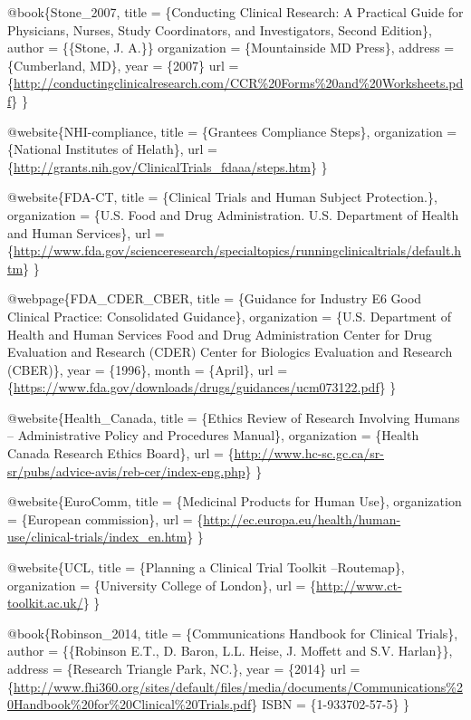 \documentclass[]{book}
\theoremstyle{definition}
\theoremstyle{definition}
\theoremstyle{definition}
\theoremstyle{remark}
\begin{document}
@book\{Stone\_2007, title = \{Conducting Clinical Research: A Practical
Guide for Physicians, Nurses, Study Coordinators, and Investigators,
Second Edition\}, author = \{\{Stone, J. A.\}\} organization =
\{Mountainside MD Press\}, address = \{Cumberland, MD\}, year = \{2007\}
url =
\{\url{http://conductingclinicalresearch.com/CCR\%20Forms\%20and\%20Worksheets.pdf}\}
\}

@website\{NHI-compliance, title = \{Grantees Compliance Steps\},
organization = \{National Institutes of Helath\}, url =
\{\url{http://grants.nih.gov/ClinicalTrials_fdaaa/steps.htm}\} \}

@website\{FDA-CT, title = \{Clinical Trials and Human Subject
Protection.\}, organization = \{U.S. Food and Drug Administration. U.S.
Department of Health and Human Services\}, url =
\{\url{http://www.fda.gov/scienceresearch/specialtopics/runningclinicaltrials/default.htm}\}
\}

@webpage\{FDA\_CDER\_CBER, title = \{Guidance for Industry E6 Good
Clinical Practice: Consolidated Guidance\}, organization = \{U.S.
Department of Health and Human Services Food and Drug Administration
Center for Drug Evaluation and Research (CDER) Center for Biologics
Evaluation and Research (CBER)\}, year = \{1996\}, month = \{April\},
url =
\{\url{https://www.fda.gov/downloads/drugs/guidances/ucm073122.pdf}\} \}

@website\{Health\_Canada, title = \{Ethics Review of Research Involving
Humans -- Administrative Policy and Procedures Manual\}, organization =
\{Health Canada Research Ethics Board\}, url =
\{\url{http://www.hc-sc.gc.ca/sr-sr/pubs/advice-avis/reb-cer/index-eng.php}\}
\}

@website\{EuroComm, title = \{Medicinal Products for Human Use\},
organization = \{European commission\}, url =
\{\url{http://ec.europa.eu/health/human-use/clinical-trials/index_en.htm}\}
\}

@website\{UCL, title = \{Planning a Clinical Trial Toolkit --Routemap\},
organization = \{University College of London\}, url =
\{\url{http://www.ct-toolkit.ac.uk/}\} \}

@book\{Robinson\_2014, title = \{Communications Handbook for Clinical
Trials\}, author = \{\{Robinson E.T., D. Baron, L.L. Heise, J. Moffett
and S.V. Harlan\}\}, address = \{Research Triangle Park, NC.\}, year =
\{2014\} url =
\{\url{http://www.fhi360.org/sites/default/files/media/documents/Communications\%20Handbook\%20for\%20Clinical\%20Trials.pdf}\}
ISBN = \{1-933702-57-5\} \}
\end{document}
